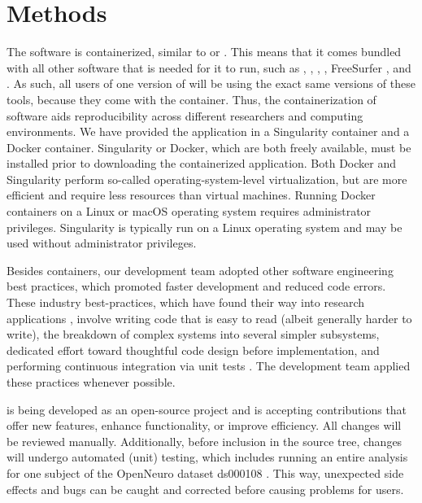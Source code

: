 \section{Methods}

The  software is containerized, similar to 
or . This means that it comes bundled with all other software
that is needed for it to run, such as 
\parencite{10.1038/s41592-018-0235-4}, 
\parencite{10.1371/journal.pone.0184661}, 
\parencite{10.1016/j.neuroimage.2011.09.015}, 
\parencite{10.1016/j.neuroimage.2010.09.025}, FreeSurfer
\parencite{10.1073/pnas.200033797}, and 
\parencite{10.1006/cbmr.1996.0014,cox_afni_1997}.
As such, all users of one version of  will be using the
exact same versions of these tools, because they come with the container.
Thus, the containerization of  software aids reproducibility
across different researchers and computing environments. We have provided
the  application in a Singularity container and a Docker
container. Singularity or Docker, which are both freely available, must be
installed prior to downloading the containerized 
application. Both Docker and Singularity perform so-called
operating-system-level virtualization, but are more efficient and require
less resources than virtual machines. Running Docker containers on a Linux
or macOS operating system requires administrator privileges. Singularity is
typically run on a Linux operating system and may be used without
administrator privileges.

Besides containers, our  development team adopted other
software engineering best practices, which promoted faster development and
reduced code errors. These industry best-practices, which have found their
way into research applications \parencite{das_programming_2018}, involve
writing code that is easy to read (albeit generally harder to write), the
breakdown of complex systems into several simpler subsystems, dedicated
effort toward thoughtful code design before implementation, and performing
continuous integration via unit tests \parencite{beckkent2000epe:}. The
 development team applied these practices whenever possible.

 is being developed as an open-source project and is
accepting contributions that offer new features, enhance functionality, or
improve efficiency. All changes will be reviewed manually. Additionally,
before inclusion in the source tree, changes will undergo automated (unit)
testing, which includes running an entire analysis for one subject of the
OpenNeuro dataset ds000108 \parencite{10.1016/j.neuron.2008.09.006}. This way,
unexpected side effects and bugs can be caught and corrected before causing
problems for users.

